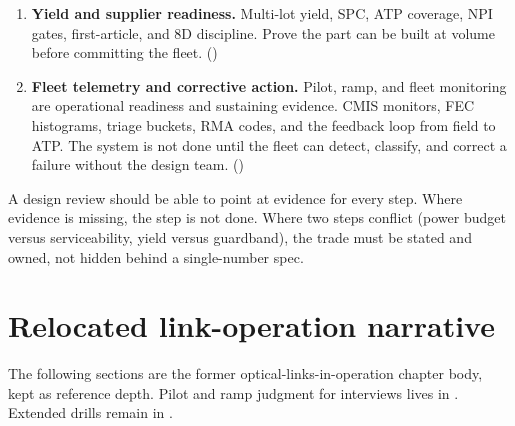 \begin{enumerate}
\item \textbf{Yield and supplier readiness.} Multi-lot yield, SPC, ATP coverage,
      NPI gates, first-article, and 8D discipline. Prove the part can be built at
      volume before committing the fleet.
      ()
\item \textbf{Fleet telemetry and corrective action.} Pilot, ramp, and fleet
      monitoring are operational readiness and sustaining evidence. CMIS
      monitors, FEC histograms, triage buckets, RMA codes, and the feedback loop
      from field to ATP. The system is not done until the fleet can detect,
      classify, and correct a failure without the design team.
      ()
\end{enumerate}

A design review should be able to point at evidence for every step. Where evidence
is missing, the step is not done. Where two steps conflict (power budget versus
serviceability, yield versus guardband), the trade must be stated and owned, not
hidden behind a single-number spec.

\section{Relocated link-operation narrative}
\label{sec:relocated-link-operation-narrative}

The following sections are the former optical-links-in-operation chapter body,
kept as reference depth. Pilot and ramp judgment for interviews lives in
. Extended drills remain in
.




